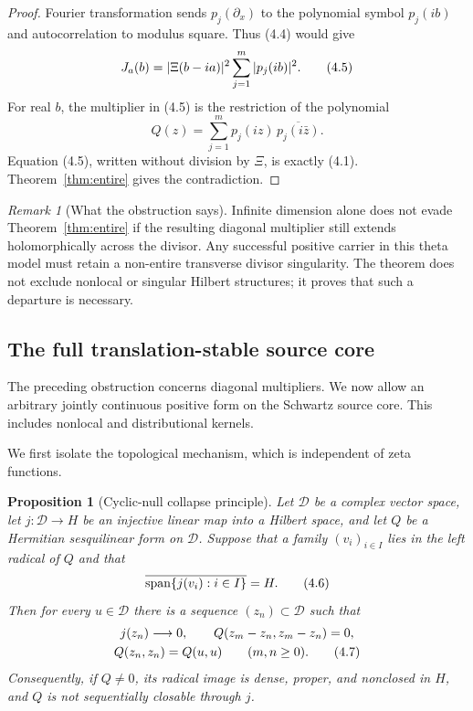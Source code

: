 \documentclass[11pt]{article}
\newtheorem{proposition}[theorem]{Proposition}
\theoremstyle{definition}
\theoremstyle{remark}
\newtheorem{remark}[theorem]{Remark}
\newcommand{\eqtag}[1]{\qquad\text{\upshape(#1)}}
\begin{document}
\begin{proof}
Fourier transformation sends \(p_j(\partial_x)\) to the polynomial
symbol \(p_j(ib)\) and autocorrelation to modulus square.  Thus (4.4)
would give
\[
  J_a(b)=|\Xi(b-ia)|^2\sum_{j=1}^m|p_j(ib)|^2.       \eqtag{4.5}
\]
For real \(b\), the multiplier in (4.5) is the restriction of the
polynomial
\[
  Q(z)=\sum_{j=1}^m
  p_j(iz)\,\overline{p_j(i\bar z)}.
\]
Equation (4.5), written without division by \(\Xi\), is exactly
(4.1).  Theorem~\ref{thm:entire} gives the contradiction.
\end{proof}

\begin{remark}[What the obstruction says]
Infinite dimension alone does not evade Theorem~\ref{thm:entire} if the
resulting diagonal multiplier still extends holomorphically across the
divisor.  Any successful positive carrier in this theta model must retain
a non-entire transverse divisor singularity.  The theorem does not
exclude nonlocal or singular Hilbert structures; it proves that such a
departure is necessary.
\end{remark}

\subsection{The full translation-stable source core}

The preceding obstruction concerns diagonal multipliers.  We now allow
an arbitrary jointly continuous positive form on the Schwartz source
core.  This includes nonlocal and distributional kernels.

We first isolate the topological mechanism, which is independent of
zeta functions.

\begin{proposition}[Cyclic-null collapse principle]
\label{prop:cyclic-null}
Let \(\mathcal D\) be a complex vector space, let
\(j:\mathcal D\to H\) be an injective linear map into a Hilbert space,
and let \(Q\) be a Hermitian sesquilinear form on \(\mathcal D\).
Suppose that a family \((v_i)_{i\in I}\) lies in the left radical of
\(Q\) and that
\[
 \overline{\operatorname{span}\{j(v_i):i\in I\}}=H.               \eqtag{4.6}
\]
Then for every \(u\in\mathcal D\) there is a sequence
\((z_n)\subset\mathcal D\) such that
\[
\begin{gathered}
 j(z_n)\longrightarrow0,\qquad
 Q(z_m-z_n,z_m-z_n)=0,\\
 Q(z_n,z_n)=Q(u,u)\qquad(m,n\geq0).                \eqtag{4.7}
\end{gathered}
\]
Consequently, if \(Q\neq0\), its radical image is dense, proper, and
nonclosed in \(H\), and \(Q\) is not sequentially closable through
\(j\).
\end{proposition}
\end{document}
